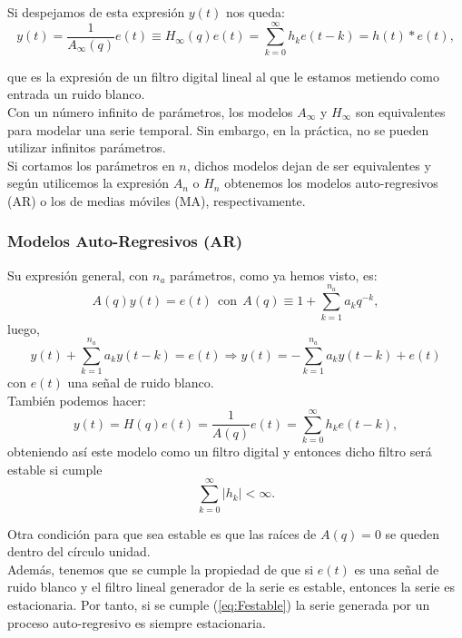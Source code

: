 Si despejamos de esta expresión $y(t)$ nos queda:
\[	y(t) = \frac{1}{A_{\infty}(q)}e(t) \equiv H_{\infty}(q)e(t) = \sum_{k=0}^{\infty} h_k e(t-k) = h(t) \ast e(t),	\]

que es la expresión de un filtro digital lineal al que le estamos metiendo como entrada un ruido blanco.\\

Con un número infinito de parámetros, los modelos $A_{\infty}$ y $H_{\infty}$ son equivalentes para modelar una serie temporal. Sin embargo, en la práctica, no se pueden utilizar infinitos parámetros.\\
Si cortamos los parámetros en $n$, dichos modelos dejan de ser equivalentes y según utilicemos la expresión $A_n$ o $H_n$ obtenemos los modelos auto-regresivos (AR) o los de medias móviles (MA), respectivamente.

\subsubsection{Modelos Auto-Regresivos (AR)}

Su expresión general, con $n_a$ parámetros, como ya hemos visto, es:
\[	A(q)y(t) = e(t) \ \ \text{con} \ \ A(q) \equiv 1 + \sum_{k=1}^{n_a} a_k q^{-k},	\]
luego,
\[ y(t) + \sum_{k=1}^{n_a} a_k y(t-k) = e(t) \Rightarrow y(t) = - \sum_{k=1}^{n_a} a_k y(t-k) + e(t)	\]
con $e(t)$ una señal de ruido blanco.\\

También podemos hacer:
\[	y(t) = H(q) e(t) = \frac{1}{A(q)}e(t) = \sum_{k=0}^{\infty} h_k e(t-k),	\]
obteniendo así este modelo como un filtro digital y entonces dicho filtro será estable si cumple 
\begin{equation} \label{eq:Festable}
\sum_{k=0}^{\infty} |h_k| < \infty.
\end{equation}

Otra condición para que sea estable es que las raíces de $A(q) = 0$ se queden dentro del círculo unidad.\\

Además, tenemos que se cumple la propiedad de que si $e(t)$ es una señal de ruido blanco y el filtro lineal generador de la serie es estable, entonces la serie es estacionaria. Por tanto, si se cumple (\ref{eq:Festable}) la serie generada por un proceso auto-regresivo es siempre estacionaria.\\

